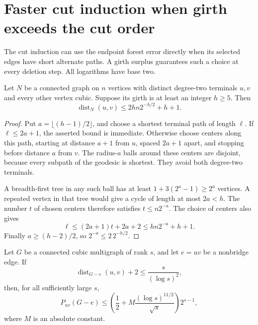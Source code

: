 \section{Faster cut induction when girth exceeds the cut order}
\label{sec:path-girth-surplus-cuts}

The cut induction can use the endpoint forest error directly when its selected edges have short alternate paths.
A girth surplus guarantees such a choice at every deletion step.
All logarithms have base two.

\begin{lemma}
\label{lem:path-geodesic-moore-balls}
Let $N$ be a connected graph on $n$ vertices with distinct degree-two terminals $u,v$ and every other vertex cubic.
Suppose its girth is at least an integer $h\ge5$.
Then
\[
 \operatorname{dist}_N(u,v)
 \le2hn2^{-h/2}+h+1.
\]
\end{lemma}

\begin{proof}
Put $a=\lfloor(h-1)/2\rfloor$, and choose a shortest terminal path of length $\ell$.
If $\ell\le2a+1$, the asserted bound is immediate.
Otherwise choose centers along this path, starting at distance $a+1$ from $u$, spaced $2a+1$ apart, and stopping before distance $a$ from $v$.
The radius-$a$ balls around these centers are disjoint, because every subpath of the geodesic is shortest.
They avoid both degree-two terminals.

A breadth-first tree in any such ball has at least $1+3(2^a-1)\ge2^a$ vertices.
A repeated vertex in that tree would give a cycle of length at most $2a<h$.
The number $t$ of chosen centers therefore satisfies $t\le n2^{-a}$.
The choice of centers also gives
\[
 \ell\le(2a+1)t+2a+2
 \le hn2^{-a}+h+1.
\]
Finally $a\ge(h-2)/2$, so $2^{-a}\le2\,2^{-h/2}$.
\end{proof}

\begin{lemma}
\label{lem:path-short-alternate-endpoint}
Let $G$ be a connected cubic multigraph of rank $s$, and let $e=uv$ be a nonbridge edge.
If
\[
 \operatorname{dist}_{G-e}(u,v)+2\le\frac{s}{(\log s)^2},
\]
then, for all sufficiently large $s$,
\[
 P_{uv}(G-e)
 \le\left(\frac12+M\frac{(\log s)^{11/2}}{\sqrt s}\right)2^{s-1},
\]
where $M$ is an absolute constant.
\end{lemma}

